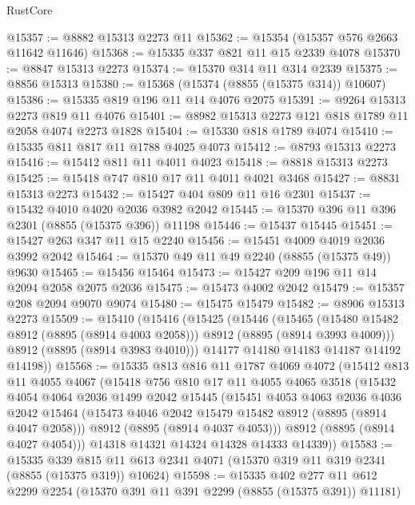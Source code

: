 \begin{lexlean}{RustCore}
\begin{coremodule}
@15357 := @8882 @15313 @2273 @11
@15362 := @15354 (@15357 @576 @2663 @11642 @11646)
@15368 := @15335 @337 @821 @11 @15 @2339 @4078
@15370 := @8847 @15313 @2273
@15374 := @15370 @314 @11 @314 @2339
@15375 := @8856 @15313
@15380 := @15368 (@15374 (@8855 (@15375 @314)) @10607)
@15386 := @15335 @819 @196 @11 @14 @4076 @2075
@15391 := @9264 @15313 @2273 @819 @11 @4076
@15401 := @8982 @15313 @2273 @121 @818 @1789 @11 @2058 @4074 @2273 @1828
@15404 := @15330 @818 @1789 @4074
@15410 := @15335 @811 @817 @11 @1788 @4025 @4073
@15412 := @8793 @15313 @2273
@15416 := @15412 @811 @11 @4011 @4023
@15418 := @8818 @15313 @2273
@15425 := @15418 @747 @810 @17 @11 @4011 @4021 @3468
@15427 := @8831 @15313 @2273
@15432 := @15427 @404 @809 @11 @16 @2301
@15437 := @15432 @4010 @4020 @2036 @3982 @2042
@15445 := @15370 @396 @11 @396 @2301 (@8855 (@15375 @396)) @11198
@15446 := @15437 @15445
@15451 := @15427 @263 @347 @11 @15 @2240
@15456 := @15451 @4009 @4019 @2036 @3992 @2042
@15464 := @15370 @49 @11 @49 @2240 (@8855 (@15375 @49)) @9630
@15465 := @15456 @15464
@15473 := @15427 @209 @196 @11 @14 @2094 @2058 @2075 @2036
@15475 := @15473 @4002 @2042
@15479 := @15357 @208 @2094 @9070 @9074
@15480 := @15475 @15479
@15482 := @8906 @15313 @2273
@15509 := @15410
    (@15416
      (@15425
        (@15446
          (@15465
            (@15480 @15482 @8912 (@8895 (@8914 @4003 @2058)))
            @8912
            (@8895 (@8914 @3993 @4009)))
          @8912
          (@8895 (@8914 @3983 @4010)))
        @14177
        @14180
        @14183
        @14187
        @14192
        @14198))
@15568 := @15335
    @813
    @816
    @11
    @1787
    @4069
    @4072
    (@15412
      @813
      @11
      @4055
      @4067
      (@15418
        @756
        @810
        @17
        @11
        @4055
        @4065
        @3518
        (@15432
          @4054
          @4064
          @2036
          @1499
          @2042
          @15445
          (@15451
            @4053
            @4063
            @2036
            @4036
            @2042
            @15464
            (@15473 @4046 @2042 @15479 @15482 @8912 (@8895 (@8914 @4047 @2058)))
            @8912
            (@8895 (@8914 @4037 @4053)))
          @8912
          (@8895 (@8914 @4027 @4054)))
        @14318
        @14321
        @14324
        @14328
        @14333
        @14339))
@15583 := @15335
    @339
    @815
    @11
    @613
    @2341
    @4071
    (@15370 @319 @11 @319 @2341 (@8855 (@15375 @319)) @10624)
@15598 := @15335
    @402
    @277
    @11
    @612
    @2299
    @2254
    (@15370 @391 @11 @391 @2299 (@8855 (@15375 @391)) @11181)

\end{coremodule}
\end{lexlean}
